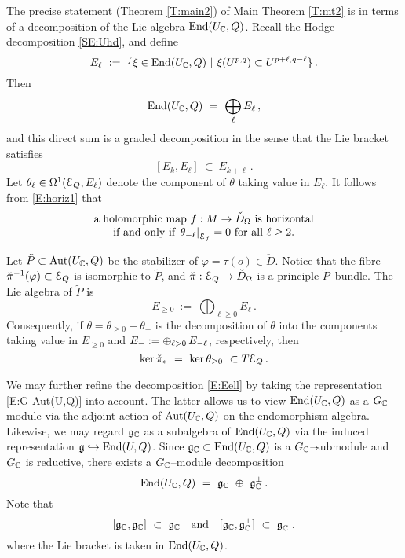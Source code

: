 \documentclass[12pt]{amsart}
\numberwithin{equation}{section}
\numberwithin{table}{section}
\numberwithin{figure}{section}
\begin{document}
The precise statement (Theorem \ref{T:main2}) of Main Theorem \ref{T:mt2} is in terms of a decomposition of the Lie algebra $\mathrm{End}(U_\mathbb C,Q)$.  Recall the Hodge decomposition \eqref{SE:Uhd}, and define
\[
  E_\ell \ := \ \{ \xi \in \tEnd(U_\bC,Q) \ | \ \xi(U^{p,q}) \subset 
  U^{p+\ell,q-\ell} \} \,.
\]
Then 
\begin{equation}\label{E:Eell}
  \mathrm{End}(U_\mathbb C,Q) \ = \ \bigoplus_\ell E_\ell \,,
\end{equation}
and this direct sum is a graded decomposition in the sense that the Lie bracket satisfies
\begin{equation}\label{E:br2}
  [ E_k, E_\ell ] \ \subset \ E_{k+\ell} \,.
\end{equation}
Let $\theta_\ell \in \Omega^1(\mathcal E_Q,E_\ell)$ denote the component of $\theta$ taking value in $E_\ell$.  It follows from \eqref{E:horiz1} that 
\begin{equation}\label{E:horiz2}
  \begin{array}{c}
  \hbox{a holomorphic map $f : M \to \check D_\Omega$ is horizontal}\\
  \hbox{if and only if 
  $\left.\theta_{-\ell}\right|_{\mathcal E_f} = 0$ for all $\ell \ge 2$.}
  \end{array}
\end{equation}

Let $\tilde P \subset \mathrm{Aut}(U_\mathbb C,Q)$ be the stabilizer of $\varphi = \tau (o) \in \check D$.  Notice that the fibre $\check\pi^{-1}(\varphi) \subset \mathcal E_Q$ is isomorphic to $\tilde P$, and $\check \pi : \mathcal E_Q \to \check D_\Omega$ is a principle $\tilde P$--bundle.  The Lie algebra of $\tilde P$ is 
\[
  E_{\ge0} \ := \ \bigoplus_{\ell\ge0 } E_\ell \,.
\]
Consequently, if $\theta = \theta_{\ge0} + \theta_-$ is the decomposition of $\theta$ into the components taking value in $E_{\ge0}$ and $E_- : = \oplus_{\ell>0}\,E_{-\ell}$, respectively, then
\begin{equation}\label{E:ker}
  \mathrm{ker}\,\check\pi_* \ = \ \mathrm{ker}\,\theta_{\ge0} \ \subset T\mathcal E_Q \,.
\end{equation}

We may further refine the decomposition \eqref{E:Eell} by taking the representation \eqref{E:G-Aut(U,Q)} into account.  The latter allows us to view $\mathrm{End}(U_\mathbb C,Q)$ as a $G_\mathbb C$--module via the adjoint action of $\mathrm{Aut}(U_\mathbb C,Q)$ on the endomorphism algebra.  Likewise, we may regard ${\mathfrak{g}}_\mathbb C$ as a subalgebra of $\mathrm{End}(U_\mathbb C,Q)$ via the induced representation ${\mathfrak{g}} \hookrightarrow \mathrm{End}(U,Q)$.  Since ${\mathfrak{g}}_\mathbb C \subset \mathrm{End}(U_\mathbb C,Q)$ is a $G_\mathbb C$--submodule and $G_\mathbb C$ is reductive, there exists a $G_\mathbb C$--module decomposition 
\[
  \tEnd(U_\bC,Q) \ = \ \fg_\bC \ \op \ \fg_\bC^\perp \,.
\]
Note that 
\begin{equation}\label{E:br1}
  [{\mathfrak{g}}_\mathbb C , {\mathfrak{g}}_\mathbb C ] \ \subset \ {\mathfrak{g}}_\mathbb C \quad\hbox{and}\quad 
  [{\mathfrak{g}}_\mathbb C , {\mathfrak{g}}_\mathbb C^\perp] \ \subset \ {\mathfrak{g}}_\mathbb C^\perp \,.
\end{equation}
where the Lie bracket is taken in $\mathrm{End}(U_\mathbb C,Q)$.  
\end{document}
